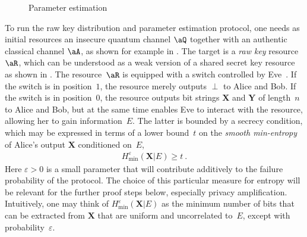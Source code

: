 \begin{figure}[h]
\noindent{}
\caption{Parameter estimation \label{fig:ParameterEstimation}}
\end{figure}

To run the raw key distribution and parameter estimation protocol, one needs as initial resources   an insecure quantum channel $\aQ$ together with an authentic classical channel $\aA$, as shown for example in . The target is a \emph{raw key} resource $\aR$, which can be understood as a weak version of a shared secret key resource as shown in . The resource~$\aR$ is equipped with a switch controlled by Eve~\cite{Portmann2017}. If the switch is in position~$1$, the resource merely outputs $\perp$ to Alice and Bob. If the switch is in position~$0$, the resource outputs bit strings $\mathbf{X}$ and $\mathbf{Y}$ of length~$n$ to Alice and Bob, but at the same time enables Eve to interact with the resource, allowing her to gain information~$E$. The latter is bounded by a secrecy condition, which may be expressed in terms of a lower bound~$t$ on the \emph{smooth min-entropy}~\cite{Ren05} of  Alice's output $\mathbf{X}$ conditioned on~$E$,
\begin{align} \label{eq:Hminboundgeneral}
  H_{\min}^\varepsilon(\mathbf{X} | E) \geq t \ .
\end{align}
Here $\varepsilon > 0$ is a small parameter that will contribute additively to the failure probability of the protocol. The choice of this particular measure for entropy will be relevant for the further proof steps below, especially privacy amplification. Intuitively, one may think of $H_{\min}^\varepsilon(\mathbf{X} | E)$ as the minimum number of bits that can be extracted from $\mathbf{X}$ that are uniform and uncorrelated to~$E$, except with probability~$\varepsilon$. 

